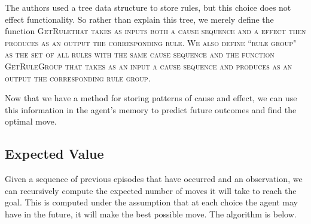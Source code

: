\documentclass[letterpaper]{article} %
\begin{document}
The authors used a tree data structure to store rules, but this choice does not effect functionality. So rather than explain this tree, we merely define the function \scshape GetRule\normalfont that takes as inputs both a cause sequence and a effect then produces as an output the corresponding rule. We also define ``rule group" as the set of all rules with the same cause sequence and the function \scshape GetRuleGroup \normalfont that takes as an input a cause sequence and produces as an output the corresponding rule group.



Now that we have a method for storing patterns of cause and effect, we can use this information in the agent's memory to predict future outcomes and find the optimal move.

\subsection{Expected Value}

Given a sequence of previous episodes that have occurred and an observation, we can recursively compute the expected number of moves it will take to reach the goal. This is computed under the assumption that at each choice the agent may have in the future, it will make the best possible move. The algorithm is below.
\end{document}
